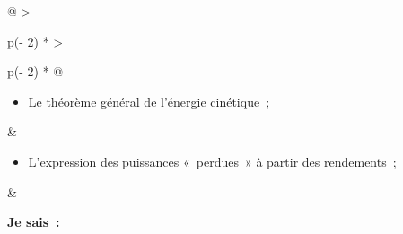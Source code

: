 \begin{longtable}[]{@{}
  >{\raggedright\arraybackslash}p{(\columnwidth - 2\tabcolsep) * }
  >{\raggedright\arraybackslash}p{(\columnwidth - 2\tabcolsep) * }@{}}
\begin{minipage}[t]{\linewidth}\raggedright
\begin{itemize}
\tightlist
\item
  Le théorème général de l'énergie cinétique~;
\end{itemize}
\end{minipage} & ⃝ \\
\begin{minipage}[t]{\linewidth}\raggedright
\begin{itemize}
\tightlist
\item
  L'expression des puissances «~perdues~» à partir des rendements~;
\end{itemize}
\end{minipage} & ⃝ \\
\end{longtable}

\textbf{Je sais~:}

